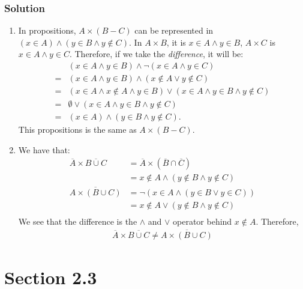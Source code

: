 \documentclass{article}
\theoremstyle{mytheoremstyle}
\theoremstyle{mytheoremstyle}
\theoremstyle{myproblemstyle}
\begin{document}
    \subsubsection*{Solution}
        \begin{enumerate} [label = (\alph*)]
            \item In propositions, \(A \times (B - C)\) can be represented in \((x \in A) \land (y \in B \land y \notin C)\).
            In \(A \times B\), it is \(x \in A \land y \in B\), \(A \times C\) is \(x \in A \land y \in C\). Therefore,
            if we take the \textit{difference}, it will be:
            \begin{align*}
                &(x \in A \land y \in B) \land \lnot(x \in A \land y \in C)\\
                = &(x \in A \land y \in B) \land (x \notin A \lor y \notin C)\\
                = &(x \in A \land x \notin A \land y \in B) \lor (x \in A \land y \in B \land y \notin C)\\
                = & \emptyset \lor (x \in A \land y \in B \land y \notin C)\\
                = & (x \in A) \land (y \in B \land y \notin C).
            \end{align*}
        This propositions is the same as \(A \times (B - C)\).
            \item We have that:
                \begin{align*}
                    \overline{A} \times \overline{B \cup C} &= \overline{A} \times (\overline{B} \cap \overline{C})\\
                    &= x \notin A \land (y \notin B \land y \notin C)\\
                    \overline{A \times (B \cup C)} &= \lnot(x \in A \land (y \in B \lor y \in C))\\
                    &= x \notin A \lor (y \notin B \land y \notin C)\\
                \end{align*}
            We see that the difference is the \(\land\) and \(\lor\) operator behind \(x \notin A\). Therefore,
            \begin{align*}
                \overline{A} \times \overline{B \cup C} \neq \overline{A \times (B \cup C)}
            \end{align*}
        \end{enumerate}
    \section*{Section 2.3}
\end{document}
